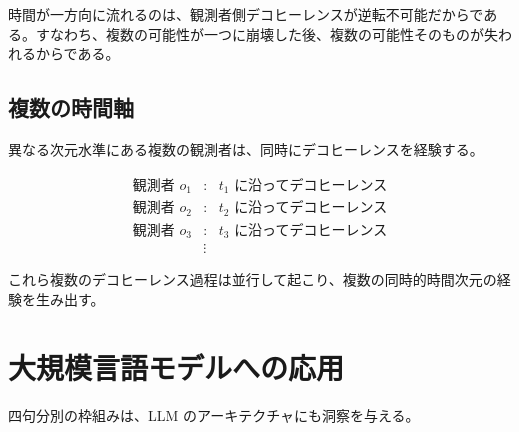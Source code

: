 \documentclass[12pt,a4paper]{article}
\theoremstyle{definition}
\begin{document}
時間が一方向に流れるのは、観測者側デコヒーレンスが逆転不可能だからである。すなわち、複数の可能性が一つに崩壊した後、複数の可能性そのものが失われるからである。

\subsection{複数の時間軸}

異なる次元水準にある複数の観測者は、同時にデコヒーレンスを経験する。

\begin{equation}
\begin{aligned}
\text{観測者 } o_1 &: \text{ } t_1 \text{ に沿ってデコヒーレンス} \\
\text{観測者 } o_2 &: \text{ } t_2 \text{ に沿ってデコヒーレンス} \\
\text{観測者 } o_3 &: \text{ } t_3 \text{ に沿ってデコヒーレンス} \\
&\vdots
\end{aligned}
\end{equation}

これら複数のデコヒーレンス過程は並行して起こり、複数の同時的時間次元の経験を生み出す。

\section{大規模言語モデルへの応用}

四句分別の枠組みは、LLM のアーキテクチャにも洞察を与える。
\end{document}
